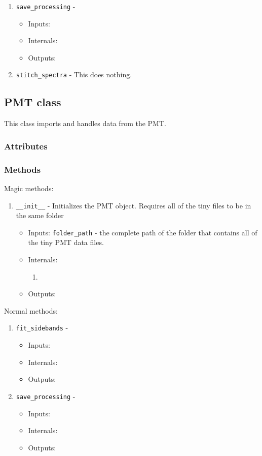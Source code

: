 \documentclass{article}
\newcommand{\code}{\texttt}
\begin{document}
\begin{enumerate}
	\item \code{save\_processing} - 
	\begin{itemize}
		\item Inputs:
		\item Internals:
		\item Outputs:
	\end{itemize}
	
	\item \code{stitch\_spectra} - This does nothing.
\end{enumerate}

\subsection{PMT class}
\indent \indent This class imports and handles data from the PMT. 
\subsubsection{Attributes}
\subsubsection{Methods}
Magic methods:
\begin{enumerate}
	\item \code{\_\_init\_\_} - Initializes the PMT object. Requires all of the tiny files to be in the same folder
	\begin{itemize}
		\item Inputs: \code{folder\_path} - the complete path of the folder that contains all of the tiny PMT data files.
		\item Internals:
		\begin{enumerate}
			\item 
		\end{enumerate}
		\item Outputs:
	\end{itemize}
\end{enumerate}

\noindent Normal methods:
\begin{enumerate}
	\item \code{fit\_sidebands} - 
	\begin{itemize}
		\item Inputs:
		\item Internals:
		\item Outputs:
	\end{itemize}
	
	\item \code{save\_processing} - 
	\begin{itemize}
		\item Inputs:
		\item Internals:
		\item Outputs:
	\end{itemize}
\end{enumerate}
\end{document}
